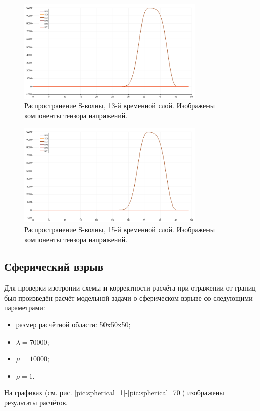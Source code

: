 \begin{figure}[htp]
\centering
\includegraphics[width=0.8\textwidth]{png/s-wave-test/s/0013.png}
\caption{Распространение S-волны, 13-й временной слой. Изображены компоненты тензора напряжений.}
\end{figure}

\begin{figure}[htp]
\centering
\includegraphics[width=0.8\textwidth]{png/s-wave-test/s/0015.png}
\caption{Распространение S-волны, 15-й временной слой. Изображены компоненты тензора напряжений.}
\label{pic:s_wave_15}
\end{figure}

\clearpage
\newpage

\subsection{Сферический взрыв}
Для проверки изотропии схемы и корректности расчёта при отражении от границ был произведён расчёт
модельной задачи о сферическом взрыве со следующими параметрами:
\begin{itemize}
\item размер расчётной области: 50x50x50;
\item $\lambda=70000$;
\item $\mu=10000$;
\item $\rho=1$.
\end{itemize}
На графиках (см. рис. \ref{pic:spherical_1}-\ref{pic:spherical_70}) изображены
результаты расчётов.

